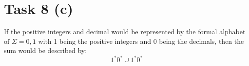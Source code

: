 \chapter{Task 8 (c)}
If the positive integers and decimal would be represented by the formal alphabet of $\Sigma = {0,1}$ with 1 being the positive integers and 0 being the decimals, then the sum would be described by:
$$1^*0^* \cup 1^*0^*$$